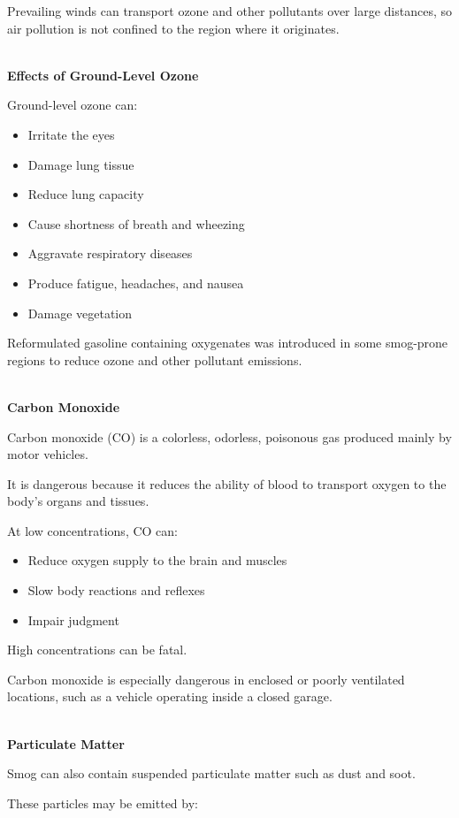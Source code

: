 \documentclass[12pt]{article}
\begin{document}
Prevailing winds can transport ozone and other pollutants over large distances, so air pollution is not confined to the region where it originates.

\textbf{\\ Effects of Ground-Level Ozone}

Ground-level ozone can:

\begin{itemize}
    \item Irritate the eyes
    \item Damage lung tissue
    \item Reduce lung capacity
    \item Cause shortness of breath and wheezing
    \item Aggravate respiratory diseases
    \item Produce fatigue, headaches, and nausea
    \item Damage vegetation
\end{itemize}

Reformulated gasoline containing oxygenates was introduced in some smog-prone regions to reduce ozone and other pollutant emissions.

\textbf{\\ Carbon Monoxide}

Carbon monoxide (CO) is a colorless, odorless, poisonous gas produced mainly by motor vehicles.

It is dangerous because it reduces the ability of blood to transport oxygen to the body's organs and tissues.

At low concentrations, CO can:

\begin{itemize}
    \item Reduce oxygen supply to the brain and muscles
    \item Slow body reactions and reflexes
    \item Impair judgment
\end{itemize}

High concentrations can be fatal.

Carbon monoxide is especially dangerous in enclosed or poorly ventilated locations, such as a vehicle operating inside a closed garage.

\textbf{\\ Particulate Matter}

Smog can also contain suspended particulate matter such as dust and soot.

These particles may be emitted by:
\end{document}
